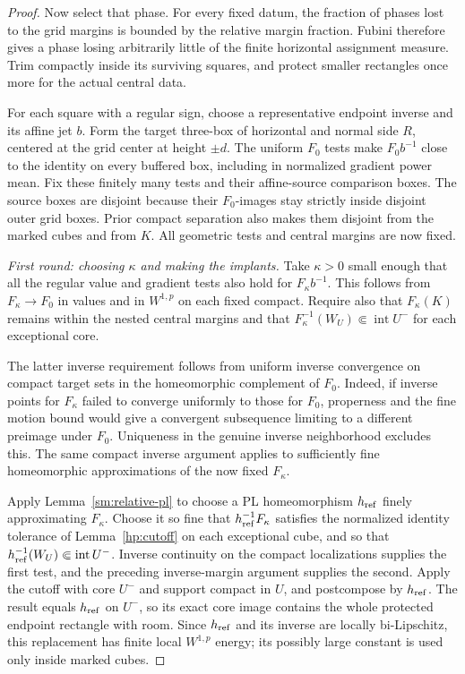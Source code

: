 \documentclass[11pt]{article}
\numberwithin{equation}{section}
\theoremstyle{definition}
\theoremstyle{remark}
\begin{document}
\begin{proof}
Now select that phase.  For every fixed datum, the fraction of phases
lost to the grid margins is bounded by the relative margin fraction.
Fubini therefore gives a phase losing arbitrarily little of the finite
horizontal assignment measure.  Trim compactly inside its surviving
squares, and protect smaller rectangles once more for the actual
central data.

For each square with a regular sign, choose a representative endpoint
inverse and its affine jet $b$.  Form the target three-box of horizontal
and normal side $R$, centered at the grid center at height $\pm d$.
The uniform $F_0$ tests make $F_0b^{-1}$ close to the identity on
every buffered box, including in normalized gradient power mean.
Fix these finitely many tests and their affine-source comparison
boxes.  The source boxes are disjoint because their $F_0$-images stay
strictly inside disjoint outer grid boxes.  Prior compact separation
also makes them disjoint from the marked cubes and from $K$.
All geometric tests and central margins are now fixed.

\emph{First round: choosing $\kappa$ and making the implants.}
Take $\kappa>0$ small enough that all the regular value and gradient
tests also hold for $F_\kappa b^{-1}$.  This follows from
$F_\kappa\to F_0$ in values and in $W^{1,p}$ on each fixed compact.
Require also that $F_\kappa(K)$ remains within the nested central
margins and that $F_\kappa^{-1}(W_U)\Subset\operatorname{int} U^-$ for each
exceptional core.

The latter inverse requirement follows from uniform inverse convergence
on compact target sets in the homeomorphic complement of $F_0$.
Indeed, if inverse points for $F_\kappa$ failed to converge uniformly
to those for $F_0$, properness and the fine motion bound would give a
convergent subsequence limiting to a different preimage under $F_0$.
Uniqueness in the genuine inverse neighborhood excludes this.
The same compact inverse argument applies to sufficiently fine
homeomorphic approximations of the now fixed $F_\kappa$.

Apply Lemma~\ref{sm:relative-pl} to choose a PL homeomorphism
$h_{\rm ref}$ finely approximating $F_\kappa$.  Choose it so fine
that $h_{\rm ref}^{-1}F_\kappa$ satisfies the normalized identity
tolerance of Lemma~\ref{hp:cutoff} on each exceptional cube, and so
that $h_{\rm ref}^{-1}(W_U)\Subset\operatorname{int} U^-$.
Inverse continuity on the compact localizations supplies the first
test, and the preceding inverse-margin argument supplies the second.
Apply the cutoff with core $U^-$ and support compact in $U$, and
postcompose by $h_{\rm ref}$.  The result equals $h_{\rm ref}$ on
$U^-$, so its exact core image contains the whole protected endpoint
rectangle with room.  Since $h_{\rm ref}$ and its inverse are locally
bi-Lipschitz, this replacement has finite local $W^{1,p}$ energy;
its possibly large constant is used only inside marked cubes.


\end{proof}
\end{document}
